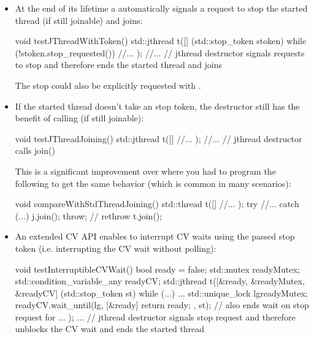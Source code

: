 \begin{itemize}
 \item At the end of its lifetime a  automatically signals a request to stop the started thread
        (if still joinable) and joins:
\begin{codeblock}
void testJThreadWithToken() 
{
    std::jthread t([] (std::stop_token stoken) {
                     while (!stoken.stop_requested()) {
                       //...
                     }
                   });
    //...
} // jthread destructor signals requests to stop and therefore ends the started thread and joins
\end{codeblock}

The stop could also be explicitly requested with .

 \item If the started thread doesn't take an stop token, 
        the destructor still has the benefit of calling  (if still joinable):
\begin{codeblock}
void testJThreadJoining()
{
    std::jthread t([] {
                     //...
                   });
    //...
} // jthread destructor calls join()
\end{codeblock}
        This is a significant improvement over  where you had to program the following
        to get the same behavior (which is common in many scenarios):
\begin{codeblock}
void compareWithStdThreadJoining()
{
    std::thread t([] {
                    //...
                  });
    try {
      //...
    }
    catch (...) {
      j.join();
      throw;  // rethrow
    }
    t.join();
}
\end{codeblock}

 \item An extended CV API enables to interrupt CV waits using the passed stop token
        (i.e. interrupting the CV wait without polling):
\begin{codeblock}
void testInterruptibleCVWait() 
{
  bool ready = false;
  std::mutex readyMutex;
  std::condition_variable_any readyCV;
  std::jthread t([&ready, &readyMutex, &readyCV] (std::stop_token st) {
                    while (...) {
                      ...
                      {
                        std::unique_lock lg{readyMutex};
                        readyCV.wait_until(lg,
                                           [&ready] {
                                              return ready;
                                           },
                                           st);  // also ends wait on stop request for 
                      }
                      ...
                    }
                  });
  ...
} // jthread destructor signals stop request and therefore unblocks the CV wait and ends the started thread
\end{codeblock}
\end{itemize}


